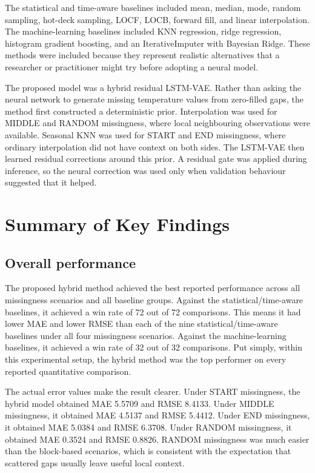 The statistical and time-aware baselines included mean, median, mode, random sampling, hot-deck sampling, LOCF, LOCB, forward fill, and linear interpolation. The machine-learning baselines included KNN regression, ridge regression, histogram gradient boosting, and an IterativeImputer with Bayesian Ridge. These methods were included because they represent realistic alternatives that a researcher or practitioner might try before adopting a neural model.

The proposed model was a hybrid residual LSTM-VAE. Rather than asking the neural network to generate missing temperature values from zero-filled gaps, the method first constructed a deterministic prior. Interpolation was used for MIDDLE and RANDOM missingness, where local neighbouring observations were available. Seasonal KNN was used for START and END missingness, where ordinary interpolation did not have context on both sides. The LSTM-VAE then learned residual corrections around this prior. A residual gate was applied during inference, so the neural correction was used only when validation behaviour suggested that it helped.

\section{Summary of Key Findings}

\subsection{Overall performance}

The proposed hybrid method achieved the best reported performance across all missingness scenarios and all baseline groups. Against the statistical/time-aware baselines, it achieved a win rate of 72 out of 72 comparisons. This means it had lower MAE and lower RMSE than each of the nine statistical/time-aware baselines under all four missingness scenarios. Against the machine-learning baselines, it achieved a win rate of 32 out of 32 comparisons. Put simply, within this experimental setup, the hybrid method was the top performer on every reported quantitative comparison.

The actual error values make the result clearer. Under START missingness, the hybrid model obtained MAE 5.5709 and RMSE 8.4133. Under MIDDLE missingness, it obtained MAE 4.5137 and RMSE 5.4412. Under END missingness, it obtained MAE 5.0384 and RMSE 6.3708. Under RANDOM missingness, it obtained MAE 0.3524 and RMSE 0.8826. RANDOM missingness was much easier than the block-based scenarios, which is consistent with the expectation that scattered gaps usually leave useful local context.


